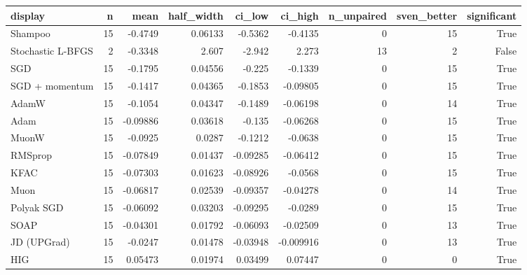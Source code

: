 \begin{tabular}{lrrrrrrrr}
\toprule
display & n & mean & half\_width & ci\_low & ci\_high & n\_unpaired & sven\_better & significant \\
\midrule
Shampoo & 15 & -0.4749 & 0.06133 & -0.5362 & -0.4135 & 0 & 15 & True \\
Stochastic L-BFGS & 2 & -0.3348 & 2.607 & -2.942 & 2.273 & 13 & 2 & False \\
SGD & 15 & -0.1795 & 0.04556 & -0.225 & -0.1339 & 0 & 15 & True \\
SGD + momentum & 15 & -0.1417 & 0.04365 & -0.1853 & -0.09805 & 0 & 15 & True \\
AdamW & 15 & -0.1054 & 0.04347 & -0.1489 & -0.06198 & 0 & 14 & True \\
Adam & 15 & -0.09886 & 0.03618 & -0.135 & -0.06268 & 0 & 15 & True \\
MuonW & 15 & -0.0925 & 0.0287 & -0.1212 & -0.0638 & 0 & 15 & True \\
RMSprop & 15 & -0.07849 & 0.01437 & -0.09285 & -0.06412 & 0 & 15 & True \\
KFAC & 15 & -0.07303 & 0.01623 & -0.08926 & -0.0568 & 0 & 15 & True \\
Muon & 15 & -0.06817 & 0.02539 & -0.09357 & -0.04278 & 0 & 14 & True \\
Polyak SGD & 15 & -0.06092 & 0.03203 & -0.09295 & -0.0289 & 0 & 15 & True \\
SOAP & 15 & -0.04301 & 0.01792 & -0.06093 & -0.02509 & 0 & 13 & True \\
JD (UPGrad) & 15 & -0.0247 & 0.01478 & -0.03948 & -0.009916 & 0 & 13 & True \\
HIG & 15 & 0.05473 & 0.01974 & 0.03499 & 0.07447 & 0 & 0 & True \\
\bottomrule
\end{tabular}
